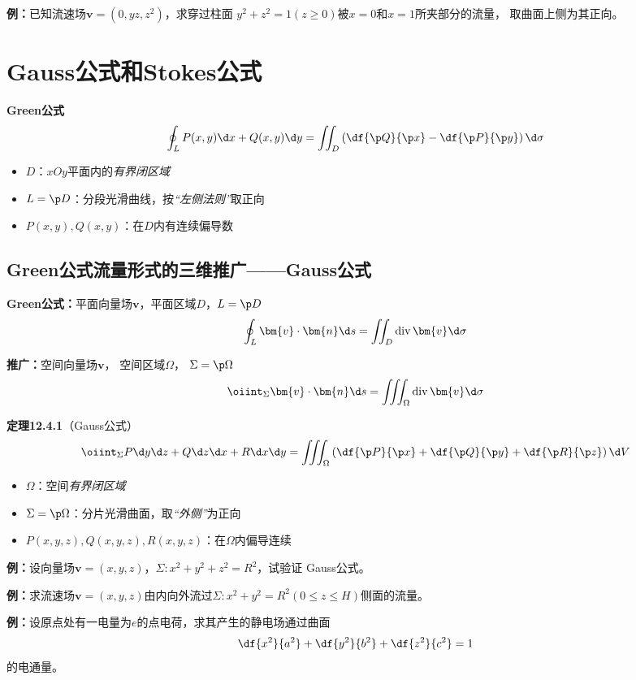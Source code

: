 {\bf 例：}已知流速场$\bm{v}=(0,yz,z^2)$，求穿过柱面
$y^2+z^2=1(z\geq 0)$被$x=0$和$x=1$所夹部分的流量，
取曲面上侧为其正向。

\section{Gauss公式和Stokes公式}


{\bf Green公式}
$$\oint_LP(x,y)\d x+Q(x,y)\d y=\iint_D\left(
\df{\p Q}{\p x}-\df{\p P}{\p y}\right)\d\sigma $$

\begin{itemize}
  \item {$D$：}$xOy$平面内的{\it 有界闭区域}
  \item {$L=\p D$：}分段光滑曲线，按{\it “左侧法则”}取正向
  \item {$P(x,y),Q(x,y)$：}在$D$内有连续偏导数
\end{itemize}

\subsection{Green公式流量形式的三维推广——Gauss公式}

{\bf Green公式：}平面向量场$\bm{v}$，平面区域$D$，$L=\p D$
$${\oint_L\bm{v}\cdot\bm{n}\d s=\iint_D\mathrm{div}\,\bm{v}\d\sigma}$$

{\bf 推广：}空间向量场$\bm{v}$， 空间区域$\Omega$， $\Sigma=\p\Omega$
$${\oiint_{\Sigma}\bm{v}\cdot\bm{n}\d
s=\iiint_{\Omega}\mathrm{div}\,\bm{v}\d\sigma}$$

{\bf 定理12.4.1}（Gauss公式）
$$\oiint_{\Sigma}P\d y\d z+Q\d z\d x+R\d x\d y=\iiint_{\Omega}
\left(\df{\p P}{\p x}+\df{\p Q}{\p y}+\df{\p R}{\p z}\right)\d V$$

\begin{itemize}
  \item {$\Omega$：}空间{\it 有界闭区域}
  \item {$\Sigma=\p\Omega$：}分片光滑曲面，取{\it “外侧”}为正向
  \item {$P(x,y,z),Q(x,y,z),R(x,y,z)$：}在$\Omega$内偏导连续
\end{itemize}

{\bf 例：}设向量场$\bm{v}=(x,y,z)$，$\Sigma:x^2+y^2+z^2=R^2$，试验证
Gauss公式。

{\bf 例：}求流速场$\bm{v}=(x,y,z)$由内向外流过$\Sigma:x^2+y^2=R^2
(0\leq z\leq H)$侧面的流量。

{\bf 例：}设原点处有一电量为$e$的点电荷，求其产生的静电场通过曲面
$$\df{x^2}{a^2}+\df{y^2}{b^2}+\df{z^2}{c^2}=1$$
的电通量。

